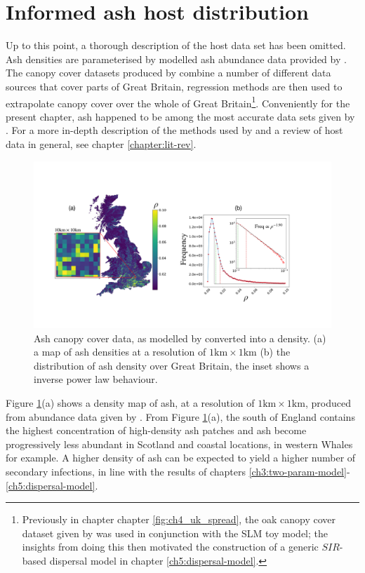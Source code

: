 \section{Informed ash host distribution}

Up to this point, a thorough description of the host data set has been omitted. Ash densities are parameterised by modelled ash abundance data provided by \cite{hill.data}. The canopy cover datasets produced by \cite{hill.data} combine a number of different data sources that cover parts of Great Britain, regression methods are then used to extrapolate canopy cover over the whole of Great Britain\footnote{Previously in chapter chapter \ref{fig:ch4_uk_spread}, the oak canopy cover dataset given by \cite{hill.data} was used in conjunction with the SLM toy model; the insights from doing this then motivated the construction of a generic $SIR$-based dispersal model in chapter \ref{ch5:dispersal-model}.}. Conveniently for the present chapter, ash happened to be among the most accurate data sets given by \cite{hill.data}. For a more in-depth description of the methods used by \cite{hill.data} and a review of host data in general, see chapter \ref{chapter:lit-rev}.

\begin{figure}
    \centering
    \includegraphics[scale=0.30]{chapter6/figures/fig3-ash-data.pdf}
    \caption{Ash canopy cover data, as modelled by \cite{hill.data} converted into a density. (a) a map of ash densities at a resolution of $1\mathrm{km} \times 1\mathrm{km}$ (b) the distribution of ash density over Great Britain, the inset shows a inverse power law behaviour.}
    \label{fig:ash-host-data}
\end{figure}

Figure \ref{fig:ash-host-data}(a) shows a density map of ash, at a resolution of $\mathrm{1km}\times \mathrm{1km}$, produced from abundance data given by \cite{hill.data}. From Figure \ref{fig:ash-host-data}(a), the south of England contains the highest concentration of high-density ash patches and ash become progressively less abundant in Scotland and coastal locations, in western Whales for example. A higher density of ash can be expected to yield a higher number of secondary infections, in line with the results of chapters \ref{ch3:two-param-model}-\ref{ch5:dispersal-model}.
 
